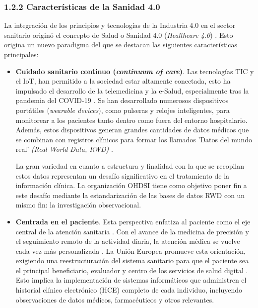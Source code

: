 \subsubsection{1.2.2 Características de la Sanidad 4.0}

La integración de los principios y tecnologías de la Industria 4.0 en el sector sanitario originó el concepto de Salud o Sanidad 4.0 (\textit{Healthcare 4.0}) \cite{tortorella2020healthcare, tortorella2021impacts}. 
Esto origina un nuevo paradigma del que se destacan las siguientes características principales: %

\begin{itemize}

\item \textbf{Cuidado sanitario continuo (\textit{continuum of care})}. Las tecnologías TIC y el IoT, han permitido a la sociedad estar altamente conectada, esto ha impulsado el desarrollo de la telemedicina y la e-Salud, especialmente tras la pandemia del COVID-19 \cite{martin2021ehealth}. Se han desarrollado numerosos dispositivos portátiles (\textit{wearable devices}), como pulseras y relojes inteligentes, para monitorear a los pacientes tanto dentro como fuera del entorno hospitalario. Además, estos dispositivos generan grandes cantidades de datos médicos que se combinan con registros clínicos para formar los llamados 'Datos del mundo real' \textit{(Real World Data, RWD)} \cite{kouroubali2019new}. 

La gran variedad en cuanto a estructura y finalidad con la que se recopilan estos datos representan un desafío significativo en el tratamiento de la información clínica. La organización OHDSI tiene como objetivo poner fin a este desafío mediante la estandarización de las bases de datos RWD con un mismo fin: la investigación observacional.


\item \textbf{Centrada en el paciente}. Esta perspectiva enfatiza al paciente como el eje central de la atención sanitaria \cite{tortorella2020healthcare}. Con el avance de la medicina de precisión y el seguimiento remoto de la actividad diaria, la atención médica se vuelve cada vez más personalizada \cite{ruiz2023inteligencia}. La Unión Europea promueve esta orientación, exigiendo una reestructuración del sistema sanitario para que el paciente sea el principal beneficiario, evaluador y centro de los servicios de salud digital \cite{ntafi2022legal, katehakis2019framework}. Esto implica la implementación de sistemas informáticos que administren el historial clínico electrónico (HCE) completo de cada individuo, incluyendo observaciones de datos médicos, farmacéuticos y otros relevantes.


\end{itemize}

